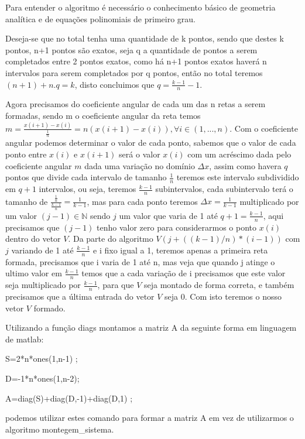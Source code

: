 \documentclass[a4paper]{article}
\begin{document}
Para entender o algoritmo é necessário o conhecimento básico de geometria analítica e de equações polinomiais de primeiro grau.

Deseja-se que no total tenha uma quantidade de k pontos, sendo que destes k pontos, n+1 pontos são exatos, seja q a quantidade de pontos a serem completados entre 2 pontos exatos, como há n+1 pontos exatos haverá n intervalos para serem completados por q pontos, então no total teremos \((n+1)+n.q=k\), disto concluimos que \(q=\frac{k-1}{n}-1\).

Agora precisamos do coeficiente angular de cada um das n retas a serem formadas, sendo m o coeficiente angular da reta temos \(m=\frac{x(i+1)-x(i)}{\frac{1}{n}}=n(x(i+1)-x(i)), \forall i \in (1,...,n) \). Com o coeficiente angular podemos determinar o valor de cada ponto, sabemos que o valor de cada ponto entre \(x(i)\) e \(x(i+1)\) será o valor \(x(i)\) com um acréscimo dada pelo coeficiente angular \(m\) dada uma variação no domínio \(\Delta x \), assim como havera \(q\) pontos que divide cada intervalo de tamanho \(\frac{1}{n}\) teremos este intervalo subdividido em \(q+1\) intervalos, ou seja, teremos \(\frac{k-1}{n}\) subintervalos, cada subintervalo terá o tamanho de \(\frac{\frac{1}{n}}{\frac{k-1}{n}}=\frac{1}{k-1}\), mas para cada ponto teremos \(\Delta x=\frac{1}{k-1}\) multiplicado por um valor \((j-1) \in \mathbb{N} \) sendo \(j\) um valor que varia de 1 até \(q+1=\frac{k-1}{n}\), aqui precisamos que \((j-1)\) tenho valor zero para considerarmos o ponto \(x(i)\) dentro do vetor \(V\). Da parte do algoritmo  \(V(j+((k-1)/n)*(i-1))\) com \(j\) variando de 1 até \(\frac{k-1}{n}\)  e i fixo igual a 1, teremos apenas a primeira reta formada, precisamos que i varia de 1 até n, mas veja que quando j atinge o ultimo valor em \(\frac{k-1}{n}\) temos que a cada variação de i precisamos que este valor seja multiplicado por \(\frac{k-1}{n}\), para que \(V\) seja montado de forma correta, e também precisamos que a última entrada do vetor \(V\) seja 0. Com isto teremos o nosso vetor \(V\) formado.
  
  \clearpage
  
  
  Utilizando a função diags montamos a matriz A da seguinte forma em linguagem de matlab:
  
  S=2*n*ones(1,n-1) ;
  
  D=-1*n*ones(1,n-2); 
  
  A=diag(S)+diag(D,-1)+diag(D,1) ;
  
  podemos utilizar estes comando para formar a matriz A em vez de utilizarmos o algoritmo montegem\_sistema.
  
\end{document}
